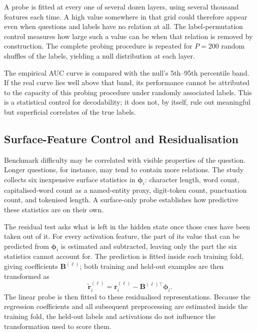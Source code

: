 A probe is fitted at every one of several dozen layers, using several thousand
features each time. A high value somewhere in that grid could therefore appear
even when questions and labels have no relation at all. The label-permutation
control measures how large such a value can be when that relation is removed by
construction. The complete probing procedure is
repeated for \(P=200\) random shuffles of the labels, yielding a null
distribution at each layer.

The empirical AUC curve is compared with the null's 5th--95th percentile band.
If the real curve lies well above that band, its performance cannot be
attributed to the capacity of this probing procedure under randomly associated
labels. This is a statistical control for decodability; it does not, by itself,
rule out meaningful but superficial correlates of the true labels.

\subsection{Surface-Feature Control and Residualisation}
\label{subsec:surface-residualisation}

Benchmark difficulty may be correlated with visible properties of the question.
Longer questions, for instance, may tend to contain more relations. The study
collects six inexpensive surface statistics in
\(\boldsymbol{\phi}_i\): character length, word count, capitalised-word count
as a named-entity proxy, digit-token count, punctuation count, and tokenised
length. A surface-only probe establishes how predictive these statistics are on
their own.

The residual test asks what is left in the hidden state once those cues have
been taken out of it. For every activation feature, the part of its value that
can be predicted from \(\boldsymbol{\phi}_i\) is estimated and subtracted,
leaving only the part the six statistics cannot account for. The prediction is
fitted inside each training fold, giving coefficients
\(\mathbf{B}^{(\ell)}\); both training and held-out examples are then
transformed as
\begin{equation}
  \widetilde{\mathbf{r}}^{(\ell)}_i
  =\mathbf{r}^{(\ell)}_i
   -\mathbf{B}^{(\ell)\top}\boldsymbol{\phi}_i.
  \label{eq:surface-residualisation}
\end{equation}
The linear probe is then fitted to these residualised representations. Because
the regression coefficients and all subsequent preprocessing are estimated
inside the training fold, the held-out labels and activations do not influence
the transformation used to score them.

